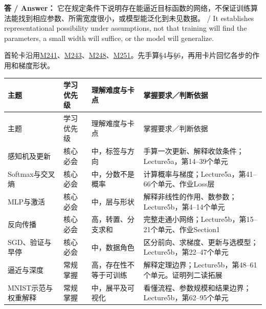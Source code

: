 \textbf{答 / Answer：} 它在规定条件下说明存在能逼近目标函数的网络，不保证训练算法能找到相应参数、所需宽度很小，或模型能泛化到未见数据。 / It establishes representational possibility under assumptions, not that training will find the parameters, a small width will suffice, or the model will generalize.



首轮卡沿用\href{https://crazyshout.github.io/micro-course/cards.html\#CS5489-M241}{M241}、\href{https://crazyshout.github.io/micro-course/cards.html\#CS5489-M243}{M243}、\href{https://crazyshout.github.io/micro-course/cards.html\#CS5489-M248}{M248}、\href{https://crazyshout.github.io/micro-course/cards.html\#CS5489-M251}{M251}。先手算§4与§6，再用卡片回忆各步的作用和梯度形状。



\begingroup
\small\setlength{\tabcolsep}{3pt}
\renewcommand{\arraystretch}{1.22}
\begin{longtable}{@{}>{\raggedright\arraybackslash}p{}>{\raggedright\arraybackslash}p{}>{\raggedright\arraybackslash}p{}>{\raggedright\arraybackslash}p{}@{}}
\toprule
主题 & 学习优先级 & 理解难度与卡点 & 掌握要求／判断依据 \\
\midrule\endfirsthead
主题 & 学习优先级 & 理解难度与卡点 & 掌握要求／判断依据 \\
\midrule\endhead
\bottomrule\endfoot
感知机及更新 & 核心必会 & 中，标签与方向 & 手算一次更新、解释收敛条件；Lecture5a，第14–39个单元 \\
Softmax与交叉熵 & 核心必会 & 中，分数不是概率 & 计算概率与梯度；Lecture5a，第41–66个单元、作业Loss层 \\
MLP与激活 & 核心必会 & 中，层与形状 & 解释非线性的作用、数参数；Lecture5b，第4–14个单元 \\
反向传播 & 核心必会 & 高，转置、分支求和 & 完整走通小网络；Lecture5b，第15–21个单元、作业Section1 \\
SGD、验证与早停 & 核心必会 & 中，数据角色 & 区分前向、求梯度、更新与选模型；Lecture5b，第22–47个单元 \\
逼近与深度 & 常规掌握 & 高，存在性不等于可训练 & 解释定理边界；Lecture5b，第48–61个单元。证明列二读拓展 \\
MNIST示范与权重解释 & 常规掌握 & 中，展平及可视化 & 看懂流程、参数规模和结果边界；Lecture5b，第62–95个单元 \\
\end{longtable}
\endgroup

